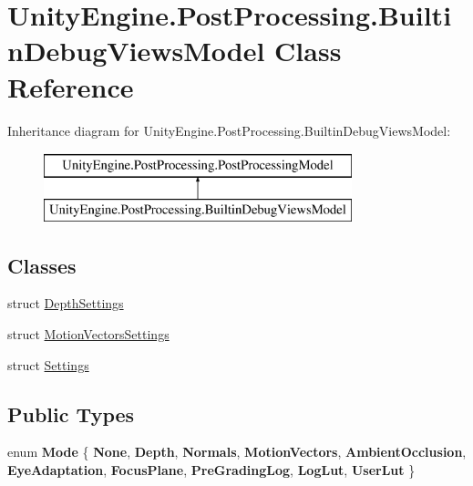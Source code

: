 \hypertarget{class_unity_engine_1_1_post_processing_1_1_builtin_debug_views_model}{}\section{Unity\+Engine.\+Post\+Processing.\+Builtin\+Debug\+Views\+Model Class Reference}
\label{class_unity_engine_1_1_post_processing_1_1_builtin_debug_views_model}
Inheritance diagram for Unity\+Engine.\+Post\+Processing.\+Builtin\+Debug\+Views\+Model\+:\begin{figure}[H]
\begin{center}
\leavevmode
\includegraphics[height=2.000000cm]{class_unity_engine_1_1_post_processing_1_1_builtin_debug_views_model}
\end{center}
\end{figure}
\subsection*{Classes}
\begin{DoxyCompactItemize}
\item 
struct \hyperlink{struct_unity_engine_1_1_post_processing_1_1_builtin_debug_views_model_1_1_depth_settings}{Depth\+Settings}
\item 
struct \hyperlink{struct_unity_engine_1_1_post_processing_1_1_builtin_debug_views_model_1_1_motion_vectors_settings}{Motion\+Vectors\+Settings}
\item 
struct \hyperlink{struct_unity_engine_1_1_post_processing_1_1_builtin_debug_views_model_1_1_settings}{Settings}
\end{DoxyCompactItemize}
\subsection*{Public Types}
\begin{DoxyCompactItemize}
\item 
\mbox{\label{class_unity_engine_1_1_post_processing_1_1_builtin_debug_views_model_a55c35be6eba5f7bb9476323f3c30de36}} 
enum {\bfseries Mode} \{ \newline
{\bfseries None}, 
{\bfseries Depth}, 
{\bfseries Normals}, 
{\bfseries Motion\+Vectors}, 
\newline
{\bfseries Ambient\+Occlusion}, 
{\bfseries Eye\+Adaptation}, 
{\bfseries Focus\+Plane}, 
{\bfseries Pre\+Grading\+Log}, 
\newline
{\bfseries Log\+Lut}, 
{\bfseries User\+Lut}
 \}
\end{DoxyCompactItemize}
